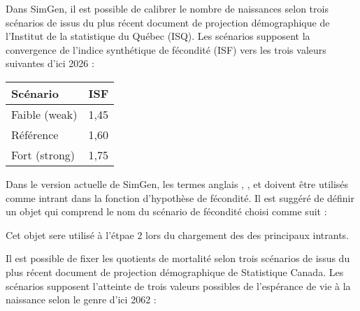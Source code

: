 \documentclass[letterpaper,10pt,french]{sphinxmanual}
\begin{document}


Dans SimGen, il est possible de calibrer le nombre de naissances selon trois scénarios de  issus du plus récent document de projection démographique de l’Institut de la statistique du Québec (ISQ).
Les scénarios supposent la convergence de l’indice synthétique de fécondité (ISF) vers les trois valeurs suivantes d’ici 2026 :


\begin{savenotes}\sphinxattablestart
\centering
\begin{tabulary}{\linewidth}[t]{|T|T|}
\hline
\sphinxstyletheadfamily 
Scénario
&\sphinxstyletheadfamily 
ISF
\\
\hline
Faible (weak)
&
1,45
\\
\hline
Référence
&
1,60
\\
\hline
Fort (strong)
&
1,75
\\
\hline
\end{tabulary}
\par
\sphinxattableend\end{savenotes}

Dans le version actuelle de SimGen, les termes anglais , , et  doivent être utilisés comme intrant dans la fonction d’hypothèse de fécondité.
Il est suggéré de définir un objet qui comprend le nom du scénario de fécondité choisi comme suit :

\begin{sphinxVerbatim}[commandchars=\\\{\}]
  
\end{sphinxVerbatim}

Cet objet sere utilisé à l’étpae 2 lors du chargement des des principaux intrants.


Il est possible de fixer les quotients de mortalité selon trois scénarios de  issus du plus récent document de projection démographique de Statistique Canada.
Les scénarios supposent l’atteinte de trois valeurs possibles de l’espérance de vie à la naissance selon le genre d’ici 2062 :
\end{document}

